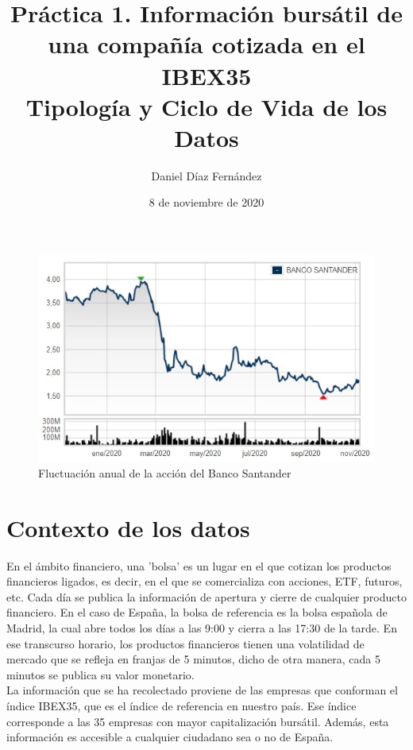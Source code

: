 \documentclass[12pt]{article}
\title{%
Práctica 1. Información bursátil de una compañía cotizada en el IBEX35\\
\large Tipología y Ciclo de Vida de los Datos}
\author{Daniel Díaz Fernández}
\date{8 de noviembre de 2020}
\begin{document}
\maketitle

\begin{figure}[H]
    \centering
    \includegraphics[width=1\columnwidth]{bolsa.jpg}
    \caption{Fluctuación anual de la acción del Banco Santander} 
    \label{flowchart}
\end{figure}

\clearpage
\section*{Contexto de los datos}
En el ámbito financiero, una 'bolsa' es un lugar en el que cotizan los productos financieros ligados, es decir, en el que se comercializa con acciones, ETF, futuros, etc. Cada día se publica la información de apertura y cierre de cualquier producto financiero. En el caso de España, la bolsa de referencia es la bolsa española de Madrid, la cual abre todos los días a las 9:00 y cierra a las 17:30 de la tarde. En ese transcurso horario, los productos financieros tienen una volatilidad de mercado que se refleja en franjas de 5 minutos, dicho de otra manera, cada 5 minutos se publica su valor monetario.\\

La información que se ha recolectado proviene de las empresas que conforman el índice IBEX35, que es el índice de referencia en nuestro país. Ese índice corresponde a las 35 empresas con mayor capitalización bursátil. Además, esta información es accesible a cualquier ciudadano sea o no de España.\\
\end{document}
